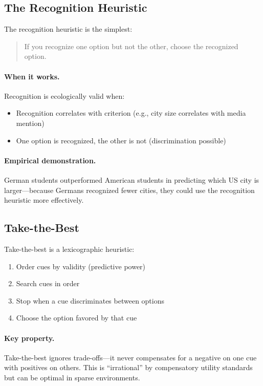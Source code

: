 \subsection{The Recognition Heuristic}

The recognition heuristic \citep{goldstein2002recognition} is the simplest:
\begin{quote}
If you recognize one option but not the other, choose the recognized option.
\end{quote}

\paragraph{When it works.} Recognition is ecologically valid when:
\begin{itemize}[nosep]
\item Recognition correlates with criterion (e.g., city size correlates with media mention)
\item One option is recognized, the other is not (discrimination possible)
\end{itemize}

\paragraph{Empirical demonstration.} German students outperformed American students in predicting which US city is larger---because Germans recognized fewer cities, they could use the recognition heuristic more effectively.

\subsection{Take-the-Best}

Take-the-best \citep{gigerenzer1996fast} is a lexicographic heuristic:

\begin{enumerate}[nosep]
\item Order cues by validity (predictive power)
\item Search cues in order
\item Stop when a cue discriminates between options
\item Choose the option favored by that cue
\end{enumerate}

\paragraph{Key property.} Take-the-best ignores trade-offs---it never compensates for a negative on one cue with positives on others. This is ``irrational'' by compensatory utility standards but can be optimal in sparse environments.

